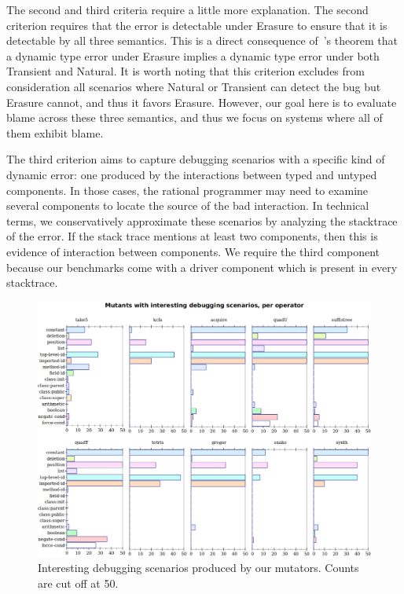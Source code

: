 The second and third criteria require a little more explanation.
The second criterion requires that the error is detectable under Erasure to ensure that it is detectable by all three semantics.
This is a direct consequence of~\citet{gfd-oopsla-2019}'s theorem that a dynamic type error under Erasure implies a dynamic type error under both Transient and Natural.
It is worth noting that this criterion excludes from consideration all scenarios where Natural or Transient can detect the bug but Erasure cannot, and thus it favors Erasure.
However, our goal here is to evaluate blame across these three semantics, and thus we focus on systems where all of them exhibit blame.


The third criterion aims to capture debugging scenarios with a specific kind of dynamic error: one produced by the interactions between typed and untyped components.
In those cases, the rational programmer may need to examine several components to locate the source of the bad interaction.
In technical terms, we conservatively approximate these scenarios by analyzing the stacktrace of the error.
If the stack trace mentions at least two components, then this is evidence of interaction between components.
We require the third component because our benchmarks come with a driver component which is present in every stacktrace.


\begin{figure}
  \centering
  \includegraphics[width=\textwidth]{./plots/mutant-breakdown}
  \caption{Interesting debugging scenarios produced by our mutators. Counts are cut off at 50.}
  \label{fig:mutant-breakdown}
\end{figure}


